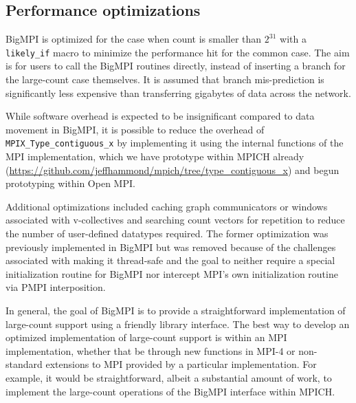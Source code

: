 \subsection{Performance optimizations}

BigMPI is optimized for the case when count is smaller than $2^{31}$
with a \texttt{likely\_if} macro to minimize the performance hit for
the common case.  The aim is for users to call the BigMPI routines
directly, instead of inserting a branch for the large-count case themselves.
It is assumed that branch mis-prediction is significantly less expensive than
transferring gigabytes of data across the network.

While software overhead is expected to be insignificant compared to data movement
in BigMPI, it is possible to reduce the overhead of \texttt{MPIX\_Type\_contiguous\_x}
by implementing it using the internal functions of the MPI implementation,
which we have prototype within MPICH already 
(\href{https://github.com/jeffhammond/mpich/tree/type_contiguous_x}
{https://github.com/jeffhammond/mpich/tree/type\_contiguous\_x})
and begun prototyping within Open MPI.

Additional optimizations included caching graph communicators or windows associated
with v-collectives and searching count vectors for repetition to reduce the number of 
user-defined datatypes required.
The former optimization was previously implemented
in BigMPI but was removed because of the challenges associated with making it 
thread-safe and the goal to neither require a special initialization routine for BigMPI
nor intercept MPI's own initialization routine via PMPI interposition.

In general, the goal of BigMPI is to provide a straightforward implementation of
large-count support using a friendly library interface.
The best way to develop an optimized implementation of large-count support
is within an MPI implementation, whether that be through new functions in MPI-4
or non-standard extensions to MPI provided by a particular implementation.
For example, it would be straightforward, albeit a substantial amount of work,
to implement the large-count operations of the BigMPI interface within MPICH.



